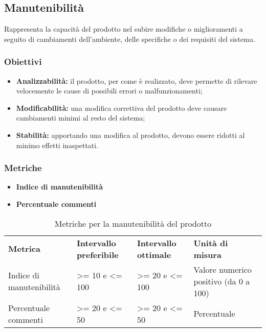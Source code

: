 \subsection{Manutenibilità}
Rappresenta la capacità del prodotto nel subire modifiche o miglioramenti a seguito di cambiamenti dell'ambiente, delle specifiche o dei requisiti del sistema.
\subsubsection{Obiettivi}
\begin{itemize}
	\item \textbf{Analizzabilità:} il prodotto, per come è realizzato, deve permette di rilevare velocemente le cause di possibili errori o malfunzionamenti;
	\item \textbf{Modificabilità:} una modifica correttiva del prodotto deve causare cambiamenti minimi al resto del sistema;
	\item \textbf{Stabilità:} apportando una modifica al prodotto, devono essere ridotti al minimo effetti inaspettati.
\end{itemize}
\subsubsection{Metriche}
\begin{itemize}
	\item \textbf{Indice di manutenibilità}
	\item \textbf{Percentuale commenti}
\end{itemize}

\renewcommand{\arraystretch}{2.2}
\begin{longtable}{|C{3cm}|C{3cm}|C{3cm}|C{3cm}|}

	\caption{Metriche per la manutenibilità del prodotto}\\
	\hline

	\textbf{Metrica} & \textbf{Intervallo preferibile}  & \textbf{Intervallo ottimale} & \textbf{Unità di misura}
	\tabularnewline
	\endfirsthead

	Indice di manutenibilità &  >= 10 e <= 100 & >= 20 e <= 100 & Valore numerico positivo (da 0 a 100) \\
	Percentuale commenti &  >= 20 e <= 50 & >= 20 e <= 50 & Percentuale \\
\end{longtable}
